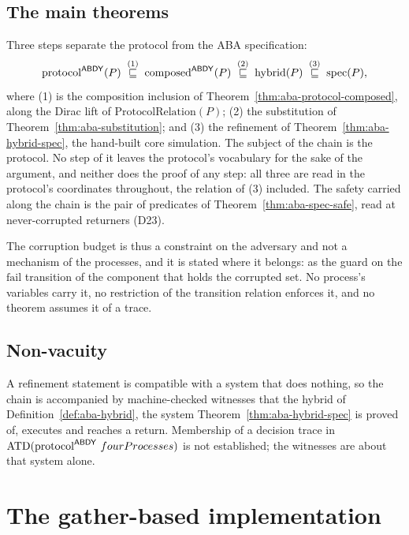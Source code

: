 \subsection{The main theorems}

Three steps separate the protocol from the ABA specification:
\[
  \mathrm{protocol}^{\mathsf{ABDY}}(P)
  \;\overset{\text{(1)}}{\sqsubseteq}\; \mathrm{composed}^{\mathsf{ABDY}}(P)
  \;\overset{\text{(2)}}{\sqsubseteq}\; \mathrm{hybrid}(P)
  \;\overset{\text{(3)}}{\sqsubseteq}\; \mathrm{spec}(P),
\]
where (1) is the composition inclusion of Theorem~\ref{thm:aba-protocol-composed}, along the Dirac lift of $\mathrm{ProtocolRelation}(P)$; (2) the substitution of Theorem~\ref{thm:aba-substitution}; and (3) the refinement of Theorem~\ref{thm:aba-hybrid-spec}, the hand-built core simulation.
The subject of the chain is the protocol.
No step of it leaves the protocol's vocabulary for the sake of the argument, and neither does the proof of any step: all three are read in the protocol's coordinates throughout, the relation of (3) included.
The safety carried along the chain is the pair of predicates of Theorem~\ref{thm:aba-spec-safe}, read at never-corrupted returners (D23).





The corruption budget is thus a constraint on the adversary and not a mechanism of the processes, and it is stated where it belongs: as the guard on the $\mathrm{fail}$ transition of the component that holds the corrupted set.
No process's variables carry it, no restriction of the transition relation enforces it, and no theorem assumes it of a trace.



\subsection{Non-vacuity}

A refinement statement is compatible with a system that does nothing, so the chain is accompanied by machine-checked witnesses that the hybrid of Definition~\ref{def:aba-hybrid}, the system Theorem~\ref{thm:aba-hybrid-spec} is proved of, executes and reaches a return.
Membership of a decision trace in $\operatorname{ATD}(\abdy{\mathrm{protocol}}\ fourProcesses)$ is not established; the witnesses are about that system alone.




\section{The gather-based implementation}
\label{sec:aba-gather}


